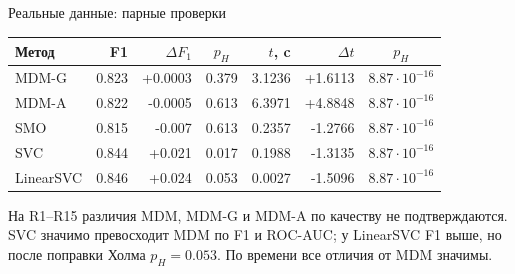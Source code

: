 \SPBGContentSlide
  {Реальные данные: парные проверки}
  {%
    \centering
    \TinyBody
    \renewcommand{\arraystretch}{1.12}
    \setlength{\tabcolsep}{2.6pt}
    \begin{tabular}{|l|r|r|c|r|r|c|}
      \hline
      \textbf{Метод} & \textbf{F1} & \textbf{$\Delta F_1$} & \textbf{$p_H$}
      & \textbf{$t$, c} & \textbf{$\Delta t$} & \textbf{$p_H$} \\
      \hline
      MDM-G & 0.823 & +0.0003 & 0.379 & 3.1236 & +1.6113 & $8.87\cdot10^{-16}$ \\
      \hline
      MDM-A & 0.822 & -0.0005 & 0.613 & 6.3971 & +4.8848 & $8.87\cdot10^{-16}$ \\
      \hline
      SMO & 0.815 & -0.007 & 0.613 & 0.2357 & -1.2766 & $8.87\cdot10^{-16}$ \\
      \hline
      SVC & 0.844 & +0.021 & 0.017 & 0.1988 & -1.3135 & $8.87\cdot10^{-16}$ \\
      \hline
      LinearSVC & 0.846 & +0.024 & 0.053 & 0.0027 & -1.5096 & $8.87\cdot10^{-16}$ \\
      \hline
    \end{tabular}

    \vspace{.18cm}
    \begin{minipage}{.90\linewidth}
      \SmallBody
      \raggedright
      На R1--R15 различия MDM, MDM-G и MDM-A по качеству не подтверждаются.
      SVC значимо превосходит MDM по F1 и ROC-AUC; у LinearSVC F1 выше, но
      после поправки Холма $p_H=0.053$. По времени все отличия от MDM значимы.
    \end{minipage}
  }
